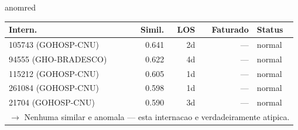 \documentclass[a4paper,10pt]{article}
\begin{document}
\begin{anomalycard}[Internacao 163033 | GHO-PETROBRAS | CRITICO (z=5.06)]{anomred}
\begin{tabular}{l r r r l}\toprule\textbf{Intern.} & \textbf{Simil.} & \textbf{LOS} & \textbf{Faturado} & \textbf{Status} \\\midrule
105743 (GOHOSP-CNU) & 0.641 & 2d & --- & \textcolor{jcubeblue}{normal} \\
94555 (GHO-BRADESCO) & 0.622 & 4d & --- & \textcolor{jcubeblue}{normal} \\
115212 (GOHOSP-CNU) & 0.605 & 1d & --- & \textcolor{jcubeblue}{normal} \\
261084 (GOHOSP-CNU) & 0.598 & 1d & --- & \textcolor{jcubeblue}{normal} \\
21704 (GOHOSP-CNU) & 0.590 & 3d & --- & \textcolor{jcubeblue}{normal} \\
\multicolumn{5}{l}{\textcolor{jcubeblue}{\small $\rightarrow$ Nenhuma similar e anomala --- esta internacao e verdadeiramente atipica.}} \\
\bottomrule\end{tabular}


\end{anomalycard}

\newpage
\end{document}
